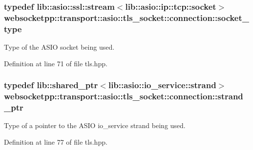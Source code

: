 \hypertarget{classwebsocketpp_1_1transport_1_1asio_1_1tls__socket_1_1connection_a99c358b4afc58ee1b1b60cf32fcf5c87}{}
\subsubsection[{socket\+\_\+type}]{\setlength{\rightskip}{0pt plus 5cm}typedef lib\+::asio\+::ssl\+::stream$<$lib\+::asio\+::ip\+::tcp\+::socket$>$ {\bf websocketpp\+::transport\+::asio\+::tls\+\_\+socket\+::connection\+::socket\+\_\+type}}\label{classwebsocketpp_1_1transport_1_1asio_1_1tls__socket_1_1connection_a99c358b4afc58ee1b1b60cf32fcf5c87}


Type of the A\+S\+I\+O socket being used. 



Definition at line 71 of file tls.\+hpp.

\hypertarget{classwebsocketpp_1_1transport_1_1asio_1_1tls__socket_1_1connection_aea9f37f95a42ad1a82a4ff0d7977ae37}{}
\subsubsection[{strand\+\_\+ptr}]{\setlength{\rightskip}{0pt plus 5cm}typedef lib\+::shared\+\_\+ptr$<$lib\+::asio\+::io\+\_\+service\+::strand$>$ {\bf websocketpp\+::transport\+::asio\+::tls\+\_\+socket\+::connection\+::strand\+\_\+ptr}}\label{classwebsocketpp_1_1transport_1_1asio_1_1tls__socket_1_1connection_aea9f37f95a42ad1a82a4ff0d7977ae37}


Type of a pointer to the A\+S\+I\+O io\+\_\+service strand being used. 



Definition at line 77 of file tls.\+hpp.

\hypertarget{classwebsocketpp_1_1transport_1_1asio_1_1tls__socket_1_1connection_a13b5aceec8084df22fbce516365e1dc8}{}
